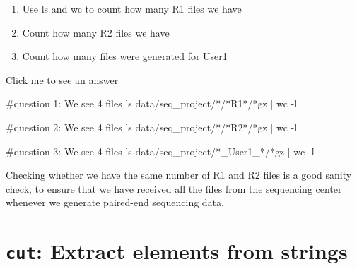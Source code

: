 \documentclass[
  letterpaper,
  DIV=11,
  numbers=noendperiod]{scrreprt}
\newenvironment{Shaded}{}{}
\newcommand{\AttributeTok}[1]{\textcolor[rgb]{0.84,0.23,0.29}{#1}}
\newcommand{\CommentTok}[1]{\textcolor[rgb]{0.42,0.45,0.49}{#1}}
\newcommand{\FunctionTok}[1]{\textcolor[rgb]{0.44,0.26,0.76}{#1}}
\newcommand{\KeywordTok}[1]{\textcolor[rgb]{0.84,0.23,0.29}{#1}}
\newcommand{\NormalTok}[1]{\textcolor[rgb]{0.14,0.16,0.18}{#1}}
\newcommand{\PreprocessorTok}[1]{\textcolor[rgb]{0.84,0.23,0.29}{#1}}
\providecommand{\tightlist}{%
  \setlength{\itemsep}{0pt}\setlength{\parskip}{0pt}}\usepackage{longtable,booktabs,array}
\begin{document}
\begin{tcolorbox}[enhanced jigsaw, colframe=quarto-callout-caution-color-frame, colbacktitle=quarto-callout-caution-color!10!white, opacitybacktitle=0.6, breakable, titlerule=0mm, colback=white, toptitle=1mm, leftrule=.75mm, opacityback=0, coltitle=black, left=2mm, toprule=.15mm, bottomtitle=1mm, rightrule=.15mm, title=\textcolor{quarto-callout-caution-color}{\faFire}\hspace{0.5em}{Exercise}, bottomrule=.15mm, arc=.35mm]

\begin{enumerate}
\def\labelenumi{\arabic{enumi}.}
\tightlist
\item
  Use ls and wc to count how many R1 files we have
\item
  Count how many R2 files we have
\item
  Count how many files were generated for User1
\end{enumerate}

Click me to see an answer

\begin{Shaded}
\begin{Highlighting}[]
\CommentTok{\#question 1: We see 4 files}
\FunctionTok{ls}\NormalTok{ data/seq\_project/}\PreprocessorTok{*}\NormalTok{/}\PreprocessorTok{*}\NormalTok{R1}\PreprocessorTok{*}\NormalTok{/}\PreprocessorTok{*}\NormalTok{gz }\KeywordTok{|} \FunctionTok{wc} \AttributeTok{{-}l} 

\CommentTok{\#question 2: We see 4 files}
\FunctionTok{ls}\NormalTok{ data/seq\_project/}\PreprocessorTok{*}\NormalTok{/}\PreprocessorTok{*}\NormalTok{R2}\PreprocessorTok{*}\NormalTok{/}\PreprocessorTok{*}\NormalTok{gz }\KeywordTok{|} \FunctionTok{wc} \AttributeTok{{-}l} 

\CommentTok{\#question 3: We see 4 files}
\FunctionTok{ls}\NormalTok{ data/seq\_project/}\PreprocessorTok{*}\NormalTok{\_User1\_}\PreprocessorTok{*}\NormalTok{/}\PreprocessorTok{*}\NormalTok{gz }\KeywordTok{|} \FunctionTok{wc} \AttributeTok{{-}l} 
\end{Highlighting}
\end{Shaded}

Checking whether we have the same number of R1 and R2 files is a good
sanity check, to ensure that we have received all the files from the
sequencing center whenever we generate paired-end sequencing data.

\end{tcolorbox}

\section{\texorpdfstring{\texttt{cut}: Extract elements from
strings}{cut: Extract elements from strings}}\label{cut-extract-elements-from-strings}
\end{document}
